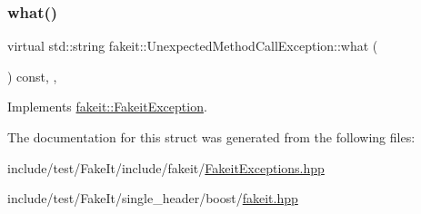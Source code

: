 \subsubsection{\texorpdfstring{what()}{what()}\hspace{0.1cm}{\footnotesize\ttfamily [9/9]}}
{\footnotesize\ttfamily virtual std\+::string fakeit\+::\+Unexpected\+Method\+Call\+Exception\+::what (\begin{DoxyParamCaption}{ }\end{DoxyParamCaption}) const\hspace{0.3cm}{\ttfamily [inline]}, {\ttfamily [override]}, {\ttfamily [virtual]}}



Implements \mbox{\hyperlink{structfakeit_1_1FakeitException_a02ef6315b98e4382157c2106a62f7718}{fakeit\+::\+Fakeit\+Exception}}.



The documentation for this struct was generated from the following files\+:\begin{DoxyCompactItemize}
\item 
include/test/\+Fake\+It/include/fakeit/\mbox{\hyperlink{FakeitExceptions_8hpp}{Fakeit\+Exceptions.\+hpp}}\item 
include/test/\+Fake\+It/single\+\_\+header/boost/\mbox{\hyperlink{single__header_2boost_2fakeit_8hpp}{fakeit.\+hpp}}\end{DoxyCompactItemize}
